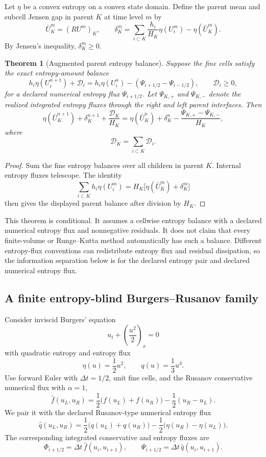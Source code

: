 \documentclass[a4paper,fleqn, sort&compress]{cas-sc}
\newtheorem{theorem}{Theorem}[section]
\theoremstyle{remark}
\theoremstyle{definition}
\begin{document}
Let \(\eta\) be a convex entropy on a convex state domain.  Define the parent
mean and subcell Jensen gap in parent \(K\) at time level \(m\) by
\[
  \bar U_K^m=(RU^m)_K,
  \qquad
  \delta_K^m
  =
  \sum_{i\subset K}\frac{h_i}{H_K}\eta(U_i^m)
  -
  \eta(\bar U_K^m).
\]
By Jensen's inequality, \(\delta_K^m\ge0\).

\begin{theorem}[Augmented parent entropy balance]
\label{thm:entropybalance}
Suppose the fine cells satisfy the exact entropy-amount balance
\[
  h_i\eta(U_i^{n+1})+\mathcal D_i
  =
  h_i\eta(U_i^n)-(\Psi_{i+1/2}-\Psi_{i-1/2}),
  \qquad
  \mathcal D_i\ge0,
\]
for a declared numerical entropy flux \(\Psi_{i+1/2}\).  Let
\(\Psi_{K,+}\) and \(\Psi_{K,-}\) denote the realized integrated entropy
fluxes through the right and left parent interfaces.  Then
\[
  \eta(\bar U_K^{n+1})
  +
  \delta_K^{n+1}
  +
  \frac{\mathcal D_K}{H_K}
  =
  \eta(\bar U_K^{n})
  +
  \delta_K^{n}
  -
  \frac{\Psi_{K,+}-\Psi_{K,-}}{H_K},
\]
where
\[
  \mathcal D_K=\sum_{i\subset K}\mathcal D_i.
\]
\end{theorem}

\begin{proof}
Sum the fine entropy balances over all children in parent \(K\).  Internal
entropy fluxes telescope.  The identity
\[
  \sum_{i\subset K}h_i\eta(U_i^m)
  =
  H_K\bigl[\eta(\bar U_K^m)+\delta_K^m\bigr]
\]
then gives the displayed parent balance after division by \(H_K\).
\end{proof}

This theorem is conditional.  It assumes a cellwise entropy balance with a
declared numerical entropy flux and nonnegative residuals.  It does not claim
that every finite-volume or Runge--Kutta method automatically has such a
balance.  Different entropy-flux conventions can redistribute entropy flux
and residual dissipation, so the information separation below is for the
declared entropy pair and declared numerical entropy flux.

\subsection{A finite entropy-blind Burgers--Rusanov family}

Consider inviscid Burgers' equation
\[
  u_t+\left(\frac{u^2}{2}\right)_x=0
\]
with quadratic entropy and entropy flux
\[
  \eta(u)=\frac12u^2,
  \qquad
  q(u)=\frac13u^3.
\]
Use forward Euler with \(\Delta t=1/2\), unit fine cells, and the Rusanov
conservative numerical flux with \(\alpha=1\),
\[
  \widehat f(u_L,u_R)
  =
  \frac12\bigl(f(u_L)+f(u_R)\bigr)
  -
  \frac12(u_R-u_L).
\]
We pair it with the declared Rusanov-type numerical entropy flux
\[
  \widehat q(u_L,u_R)
  =
  \frac12\bigl(q(u_L)+q(u_R)\bigr)
  -
  \frac12\bigl(\eta(u_R)-\eta(u_L)\bigr).
\]
The corresponding integrated conservative and entropy fluxes are
\[
  \Phi_{i+1/2}=\Delta t\,\widehat f(u_i,u_{i+1}),
  \qquad
  \Psi_{i+1/2}=\Delta t\,\widehat q(u_i,u_{i+1}).
\]
\end{document}
